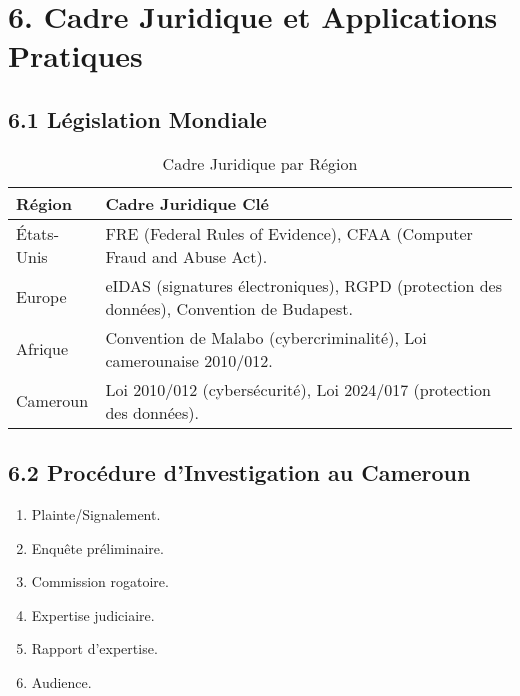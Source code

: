 \documentclass[12pt, a4paper]{report}
\begin{document}
\section*{6. Cadre Juridique et Applications Pratiques}
\subsection*{6.1 Législation Mondiale}
\begin{table}[h]
    \centering
    \caption{Cadre Juridique par Région}
    \begin{tabular}{|l|l|}
        \hline
        \textbf{Région} & \textbf{Cadre Juridique Clé} \\ \hline
        États-Unis & FRE (Federal Rules of Evidence), CFAA (Computer Fraud and Abuse Act). \\ \hline
        Europe & eIDAS (signatures électroniques), RGPD (protection des données), Convention de Budapest. \\ \hline
        Afrique & Convention de Malabo (cybercriminalité), Loi camerounaise 2010/012. \\ \hline
        Cameroun & Loi 2010/012 (cybersécurité), Loi 2024/017 (protection des données). \\ \hline
    \end{tabular}
\end{table}

\subsection*{6.2 Procédure d’Investigation au Cameroun}
\begin{enumerate}
    \item Plainte/Signalement.
    \item Enquête préliminaire.
    \item Commission rogatoire.
    \item Expertise judiciaire.
    \item Rapport d’expertise.
    \item Audience.
\end{enumerate}
\end{document}
